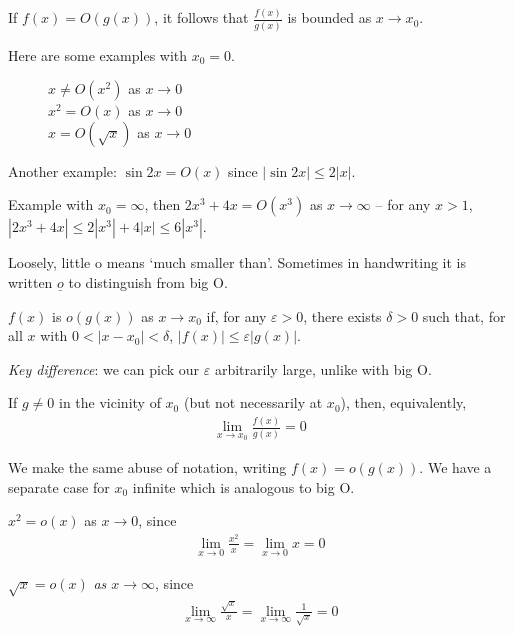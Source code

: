 \documentclass{../../template/note}
\begin{document}
    \begin{remark*}
        If \(f(x) = O(g(x))\), it follows that \(\frac{f(x)}{g(x)}\) is bounded as \(x \to x_0\).
    \end{remark*}

    
    Here are some examples with \(x_0 = 0\).
    
    \begin{figure}[ht]
        \centering
        \caption{\(x \neq O(x^2)\) as \(x \to 0\) \\ \(x^2 = O(x)\) as \(x \to 0\) \\ \(x = O(\sqrt x)\) as \(x \to 0\)}
        \label{fig:big-O-demo}
    \end{figure}
    
    Another example: \(\sin 2x = O(x)\) since \(|\sin 2x| \leq 2|x|\).
    
    Example with \(x_0 = \infty\), then \(2x^3 + 4x = O(x^3)\) as \(x \to \infty\) -- for any \(x > 1\), \(|2x^3 + 4x| \leq 2|x^3| + 4|x| \leq 6|x^3|\).

    \begin{definition}[Little o]
        Loosely, little o means `much smaller than'. Sometimes in handwriting it is written \(\underline o\) to distinguish from big O.

        \(f(x)\) is \(o(g(x))\) as \(x \to x_0\) if, for any \(\varepsilon > 0\), there exists \(\delta > 0\) such that, for all \(x\) with \(0 < |x-x_0| < \delta\), \(|f(x)| \leq \varepsilon|g(x)|\).

        \emph{Key difference}: we can pick our \(\varepsilon\) arbitrarily large, unlike with big O.

        If \(g \neq 0\) in the vicinity of \(x_0\) (but not necessarily at \(x_0\)), then, equivalently,
        \begin{align*}
            \lim_{x\to x_0} \frac{f(x)}{g(x)} = 0
        \end{align*}

        We make the same abuse of notation, writing \(f(x) = o(g(x))\). We have a separate case for \(x_0\) infinite which is analogous to big O.
    \end{definition}

    \begin{example}
        \(x^2 = o(x)\) as \(x \to 0\), since
        \begin{align*}
            \lim_{x \to 0}\frac{x^2}{x} = \lim_{x \to 0} x = 0
        \end{align*}
        
        \(\sqrt x = o(x)\) \emph{as \(x \to \infty\)}, since
        \begin{align*}
            \lim_{x \to \infty}\frac{\sqrt x}{x} = \lim_{x \to \infty} \frac{1}{\sqrt x} = 0
        \end{align*}
        
        
    \end{example}
\end{document}
